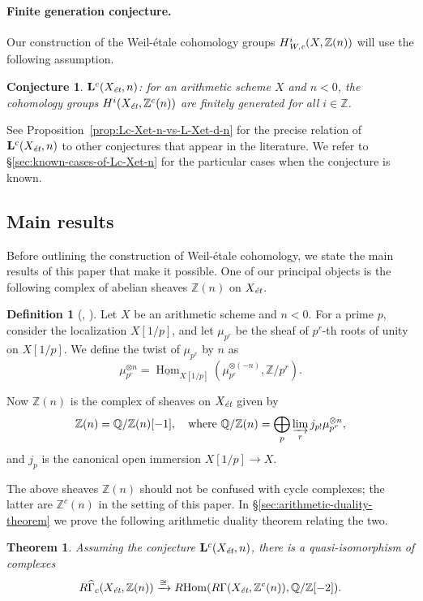 \documentclass[leqno,12pt]{article}
\theoremstyle{plain}
\newtheorem{conjecture}[theorem]{\indent\sc Conjecture}
\newtheorem{maintheorem}{Theorem}
\theoremstyle{definition}
\newtheorem{definition}[theorem]{\indent\sc Definition}
\DeclareMathOperator{\Hom}{Hom}
\newcommand{\QQ}{\mathbb{Q}}
\newcommand{\ZZ}{\mathbb{Z}}
\newcommand{\Wc}{\text{\it W,c}}
\newcommand{\et}{\text{\it \'{e}t}}
\newcommand{\iHom}{\underline{\Hom}}
\newcommand{\RHom}{R\!\Hom}
\begin{document}
\paragraph{Finite generation conjecture.}
Our construction of the Weil-\'{e}tale cohomology groups $H^i_\Wc (X,\ZZ(n))$
will use the following assumption.

\begin{conjecture}
  $\mathbf{L}^c (X_\et,n)$: for an arithmetic scheme $X$ and $n < 0$,
  the cohomology groups $H^i (X_\et, \ZZ^c (n))$ are finitely generated for all
  $i \in \ZZ$.
\end{conjecture}

See Proposition~\ref{prop:Lc-Xet-n-vs-L-Xet-d-n} for the precise relation of
$\mathbf{L}^c (X_\et,n)$ to other conjectures that appear in the literature.
We refer to \S\ref{sec:known-cases-of-Lc-Xet-n} for the particular cases when
the conjecture is known.

\subsection*{Main results}

Before outlining the construction of Weil-\'{e}tale cohomology, we state the main
results of this paper that make it possible. One of our principal objects is the
following complex of abelian sheaves $\ZZ (n)$ on $X_\et$.

\begin{definition}[{\cite[\S 3.1]{Flach-Morin-2018}}, {\cite[\S 7]{Geisser-2004}}]
  \label{dfn:sheaf-Z(n)}
  Let $X$ be an arithmetic scheme and $n < 0$. For a prime $p$, consider
  the localization $X [1/p]$, and let $\mu_{p^r}$ be the sheaf of $p^r$-th
  roots of unity on $X [1/p]$. We define the twist of $\mu_{p^r}$ by $n$
  as
  $$\mu_{p^r}^{\otimes n} = \iHom_{X[1/p]} (\mu_{p^r}^{\otimes (-n)}, \ZZ/p^r).$$

  Now $\ZZ (n)$ is the complex of sheaves on $X_\et$ given by
  \[ \ZZ (n) = \QQ/\ZZ (n) [-1],
  \quad \text{where }
  \QQ/\ZZ (n) = \bigoplus_p \varinjlim_r j_{p!} \mu_{p^r}^{\otimes n}, \]
  and $j_p$ is the canonical open immersion $X[1/p] \to X$.
\end{definition}

The above sheaves $\ZZ (n)$ should not be confused with cycle complexes;
the latter are $\ZZ^c (n)$ in the setting of this paper.
In \S\ref{sec:arithmetic-duality-theorem} we prove the following arithmetic
duality theorem relating the two.

\begin{maintheorem}
  \label{theorem-I}
  Assuming the conjecture $\mathbf{L}^c (X_\et,n)$, there is a quasi-isomorphism
  of complexes
  \[ R\widehat{\Gamma}_c (X_\et, \ZZ (n)) \xrightarrow{\cong}
  \RHom (R\Gamma (X_\et, \ZZ^c (n)), \QQ/\ZZ [-2]). \]
\end{maintheorem}
\end{document}

